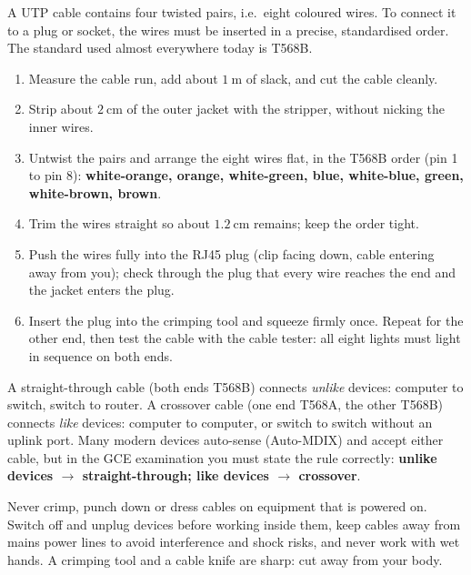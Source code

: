 \documentclass[11pt]{article}
\newcommand{\cle}[1]{{\popxbold\color{popdark}#1}}
\newcounter{popsec}
\newcounter{popsub}
\newcommand{\courssub}[1]{%
  \stepcounter{popsub}%
  \par\vspace{9pt}\noindent{\popxbold\fontsize{11.5}{13}\selectfont\color{popink}{\color{poporange}\thepopsec.\thepopsub}\hspace{6pt}#1}\par\nopagebreak\vspace{4pt}
}
\begin{document}
\courssub{Phase 3: Cabling and Crimping}

A UTP cable contains four twisted pairs, i.e.\ eight coloured wires. To connect it to a plug or socket, the wires must be inserted in a precise, standardised order. The standard used almost everywhere today is \cle{T568B}.

\begin{methode}
\begin{enumerate}
\item Measure the cable run, add about $1\ \mathrm{m}$ of slack, and cut the cable cleanly.
\item Strip about $2\ \mathrm{cm}$ of the outer jacket with the stripper, without nicking the inner wires.
\item Untwist the pairs and arrange the eight wires flat, in the T568B order (pin 1 to pin 8): \textbf{white-orange, orange, white-green, blue, white-blue, green, white-brown, brown}.
\item Trim the wires straight so about $1.2\ \mathrm{cm}$ remains; keep the order tight.
\item Push the wires fully into the RJ45 plug (clip facing down, cable entering away from you); check through the plug that every wire reaches the end and the jacket enters the plug.
\item Insert the plug into the crimping tool and squeeze firmly once. Repeat for the other end, then test the cable with the cable tester: all eight lights must light in sequence on both ends.
\end{enumerate}
\end{methode}

\begin{attention}
A \cle{straight-through} cable (both ends T568B) connects \emph{unlike} devices: computer to switch, switch to router. A \cle{crossover} cable (one end T568A, the other T568B) connects \emph{like} devices: computer to computer, or switch to switch without an uplink port. Many modern devices auto-sense (Auto-MDIX) and accept either cable, but in the GCE examination you must state the rule correctly: \textbf{unlike devices $\to$ straight-through; like devices $\to$ crossover}.
\end{attention}

\begin{attention}
Never crimp, punch down or dress cables on equipment that is powered on. Switch off and unplug devices before working inside them, keep cables away from mains power lines to avoid interference and shock risks, and never work with wet hands. A crimping tool and a cable knife are sharp: cut away from your body.
\end{attention}
\end{document}
